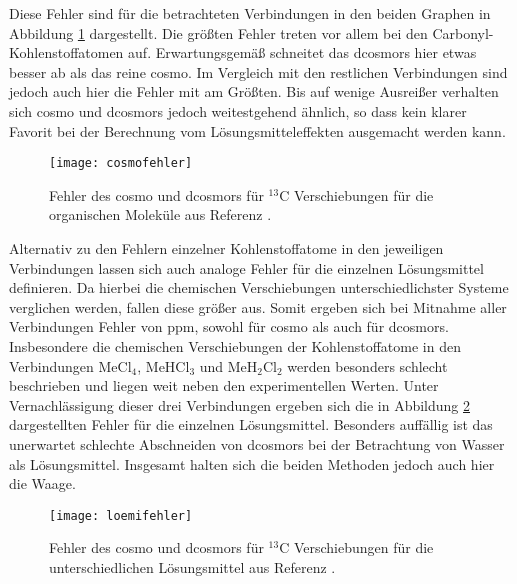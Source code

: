     Diese Fehler sind für die betrachteten Verbindungen in den beiden Graphen in Abbildung \ref{abb:cosmofehler} dargestellt. Die größten Fehler treten vor allem bei den Carbonyl-Kohlenstoffatomen auf. Erwartungsgemäß schneitet das \ac{dcosmors} hier etwas besser ab als das reine \ac{cosmo}. Im Vergleich mit den restlichen Verbindungen sind jedoch auch hier die Fehler mit am Größten. Bis auf wenige Ausreißer verhalten sich \ac{cosmo} und \ac{dcosmors} jedoch weitestgehend ähnlich, so dass kein klarer Favorit bei der Berechnung vom Lösungsmitteleffekten ausgemacht werden kann.
   	\begin{figure}[ht!]
	\centering
	\texttt{[image: cosmofehler]}
	\captionsetup{figurewithin = chapter}
	\captionsetup{font=small, labelfont=bf}\caption[{Fehler des \ac{cosmo} und \ac{dcosmors} für $^{13}$C Verschiebungen}]{Fehler des \ac{cosmo} und \ac{dcosmors} für $^{13}$C Verschiebungen für die organischen Moleküle aus Referenz \cite{fulmer2010nmr}.}
	\label{abb:cosmofehler}
	\end{figure} 
\vfill
\newpage
	Alternativ zu den Fehlern einzelner Kohlenstoffatome in den jeweiligen Verbindungen lassen sich auch analoge Fehler für die einzelnen Lösungsmittel definieren. Da hierbei die chemischen Verschiebungen unterschiedlichster Systeme verglichen werden, fallen diese größer aus. Somit ergeben sich bei Mitnahme aller Verbindungen Fehler von \unit[10-11]{ppm}, sowohl für \ac{cosmo} als auch für \ac{dcosmors}. Insbesondere die chemischen Verschiebungen der Kohlenstoffatome in den Verbindungen MeCl$_4$, MeHCl$_3$ und MeH$_2$Cl$_2$ werden besonders schlecht beschrieben und liegen weit neben den experimentellen Werten. Unter Vernachlässigung dieser drei Verbindungen ergeben sich die in Abbildung \ref{abb:loemifehler} dargestellten Fehler für die einzelnen Lösungsmittel. Besonders auffällig ist das unerwartet schlechte Abschneiden von \ac{dcosmors} bei der Betrachtung von Wasser als Lösungsmittel. Insgesamt halten sich die beiden Methoden jedoch auch hier die Waage.
   	\begin{figure}[ht!]
	\centering
	\texttt{[image: loemifehler]}
	\captionsetup{figurewithin = chapter}
	\captionsetup{font=small, labelfont=bf}\caption[{Fehler des \ac{cosmo} und \ac{dcosmors} für unterschiedliche Lösungsmittel}]{Fehler des \ac{cosmo} und \ac{dcosmors} für $^{13}$C Verschiebungen für die unterschiedlichen Lösungsmittel aus Referenz \cite{fulmer2010nmr}.}
	\label{abb:loemifehler}
	\end{figure}    	
\vfil
\newpage
	
